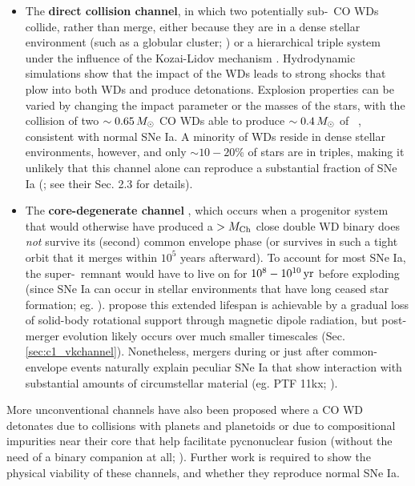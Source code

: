 \begin{itemize}
	\item The {\bf direct collision channel}, in which two potentially sub-\Mch\ CO WDs collide, rather than merge, either because they are in a dense stellar environment (such as a globular cluster; \citealt{benzth89, loreig10}) or a hierarchical triple system \citep{katzd12} under the influence of the Kozai-Lidov mechanism \citep{koza62, lido62}.  Hydrodynamic simulations \citep{rask+10, kush+13, garc+13} show that the impact of the WDs leads to strong shocks that plow into both WDs and produce detonations.  Explosion properties can be varied by changing the impact parameter or the masses of the stars, with the collision of two $\sim0.65\,\Msun$ CO WDs able to produce $\sim0.4\,\Msun$ of \Ni\ \citep{garc+13, kush+13}, consistent with normal SNe Ia.  A minority of WDs reside in dense stellar environments, however, and only $\sim10-20$\% of stars are in triples, making it unlikely that this channel alone can reproduce a substantial fraction of SNe Ia (\citealt{maozmn14}; see their Sec. 2.3 for details).

	\item The {\bf core-degenerate channel} \citep{livir03, kashs11, tsebs15}, which occurs when a progenitor system that would otherwise have produced a $>\Mch$ close double WD binary does \textit{not} survive its (second) common envelope phase (or survives in such a tight orbit that it merges within $10^5$ years afterward).  To account for most SNe Ia, the super-\Mch\ remnant would have to live on for $10^{8}-10^{10}\,\mathrm{yr}$ before exploding (since SNe Ia can occur in stellar environments that have long ceased star formation; eg. \citealt{prichs08, maozsg10}).  \cite{illks12} propose this extended lifespan is achievable by a gradual loss of solid-body rotational support through magnetic dipole radiation, but post-merger evolution likely occurs over much smaller timescales (Sec. \ref{sec:c1_vkchannel}).  Nonetheless, mergers during or just after common-envelope events naturally explain peculiar SNe Ia that show interaction with substantial amounts of circumstellar material (eg. PTF 11kx; \citealt{dild+12, soke13}).

\end{itemize}

More unconventional channels have also been proposed where a CO WD detonates due to collisions with planets and planetoids \citep{distfg15} or due to compositional impurities near their core that help facilitate pycnonuclear fusion (without the need of a binary companion at all; \citealt{chio+15}).  Further work is required to show the physical viability of these channels, and whether they reproduce normal SNe Ia.  

